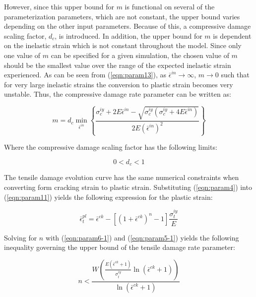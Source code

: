 However, since this upper bound for $m$ is functional on several of the parameterization parameters, which are not constant, the upper bound varies depending on the other input parameters. Because of this, a compressive damage scaling factor, $d_c$, is introduced. In addition, the upper bound for $m$ is dependent on the inelastic strain which is not constant throughout the model. Since only one value of $m$ can be specified for a given simulation, the chosen value of $m$ should be the smallest value over the range of the expected inelastic strain experienced. As can be seen from (\ref{eqn:param13}), as $\bar{\epsilon}^{in} \rightarrow \infty$, $m\rightarrow0$ such that for very large inelastic strains the conversion to plastic strain becomes very unstable. Thus, the compressive damage rate parameter can be written as:

\begin{equation}
m=d_{c}\min_{\bar{\epsilon}^{in}}\left\{\frac{\sigma_{c}^{iy}+2E\bar{\epsilon}^{in}-\sqrt{\sigma_{c}^{iy}\left(\sigma_{c}^{iy}+4E\bar{\epsilon}^{in}\right)}}{2E\left(\bar{\epsilon}^{in}\right)^{2}}\right\}
\label{eqn:param14}
\end{equation}


Where the compressive damage scaling factor has the following limits:

\begin{equation}
0<d_{c}<1\label{eqn:param15}
\end{equation}


The tensile damage evolution curve has the same numerical constraints when converting form cracking strain to plastic strain. Substituting (\ref{eqn:param4}) into (\ref{eqn:param11}) yields the following expression for the plastic strain:

\begin{equation}
\bar{\epsilon}_{t}^{pl}=\bar{\epsilon}^{ck}-\left[\left(1+\bar{\epsilon}^{ck}\right)^{n}-1\right]\frac{\sigma_{t}^{iy}}{E}\label{eqn:param5-1}
\end{equation}

Solving for $n$ with (\ref{eqn:param6-1}) and (\ref{eqn:param5-1}) yields the following inequality governing the upper bound of the tensile damage rate parameter:

\begin{equation}
n<\frac{W\left(\frac{E\left(\bar{\epsilon}^{ck}+1\right)}{\sigma_{t}^{iy}}\ln\left(\bar{\epsilon}^{ck}+1\right)\right)}{\ln\left(\bar{\epsilon}^{ck}+1\right)}\label{eqn:param7}
\end{equation}

